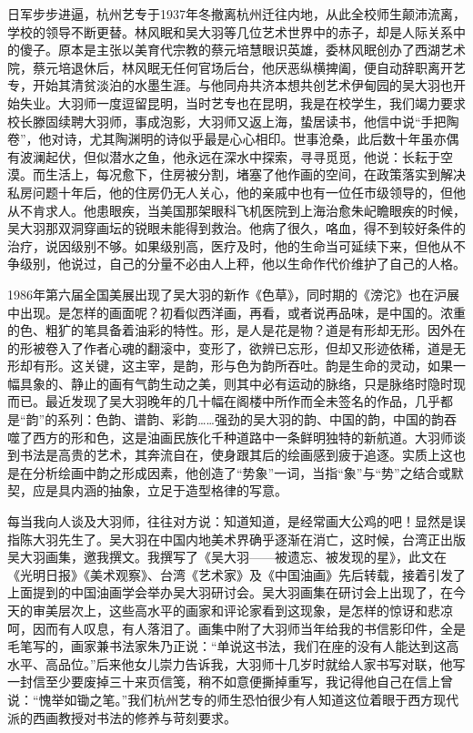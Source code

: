 \documentclass{article}
\begin{document}
日军步步进逼，杭州艺专于1937年冬撤离杭州迁往内地，从此全校师生颠沛流离，学校的领导不断更替。林风眠和吴大羽等几位艺术世界中的赤子，却是人际关系中的傻子。原本是主张以美育代宗教的蔡元培慧眼识英雄，委林风眠创办了西湖艺术院，蔡元培退休后，林风眠无任何官场后台，他厌恶纵横捭阖，便自动辞职离开艺专，开始其清贫淡泊的水墨生涯。与他同舟共济本想共创艺术伊甸园的吴大羽也开始失业。大羽师一度逗留昆明，当时艺专也在昆明，我是在校学生，我们竭力要求校长滕固续聘大羽师，事成泡影，大羽师又返上海，蛰居读书，他信中说“手把陶卷”，他对诗，尤其陶渊明的诗似乎最是心心相印。世事沧桑，此后数十年虽亦偶有波澜起伏，但似潜水之鱼，他永远在深水中探索，寻寻觅觅，他说：长耘于空漠。而生活上，每况愈下，住房被分割，堵塞了他作画的空间，在政策落实到解决私房问题十年后，他的住房仍无人关心，他的亲戚中也有一位任市级领导的，但他从不肯求人。他患眼疾，当美国那架眼科飞机医院到上海治愈朱屺瞻眼疾的时候，吴大羽那双洞穿画坛的锐眼未能得到救治。他病了很久，咯血，得不到较好条件的治疗，说因级别不够。如果级别高，医疗及时，他的生命当可延续下来，但他从不争级别，他说过，自己的分量不必由人上秤，他以生命作代价维护了自己的人格。

1986年第六届全国美展出现了吴大羽的新作《色草》，同时期的《滂沱》也在沪展中出现。是怎样的画面呢？初看似西洋画，再看，或者说再品味，是中国的。浓重的色、粗犷的笔具备着油彩的特性。形，是人是花是物？道是有形却无形。因外在的形被卷入了作者心魂的翻滚中，变形了，欲辨已忘形，但却又形迹依稀，道是无形却有形。这关键，这主宰，是韵，形与色为韵所吞吐。韵是生命的灵动，如果一幅具象的、静止的画有气韵生动之美，则其中必有运动的脉络，只是脉络时隐时现而已。最近发现了吴大羽晚年的几十幅在阁楼中所作而全未签名的作品，几乎都是“韵”的系列：色韵、谱韵、彩韵……强劲的吴大羽的韵、中国的韵，中国的韵吞噬了西方的形和色，这是油画民族化千种道路中一条鲜明独特的新航道。大羽师谈到书法是高贵的艺术，其奔流自在，使身跟其后的绘画感到疲于追逐。实质上这也是在分析绘画中韵之形成因素，他创造了“势象”一词，当指“象”与“势”之结合或默契，应是具内涵的抽象，立足于造型格律的写意。

每当我向人谈及大羽师，往往对方说：知道知道，是经常画大公鸡的吧！显然是误指陈大羽先生了。吴大羽在中国内地美术界确乎逐渐在消亡，这时候，台湾正出版吴大羽画集，邀我撰文。我撰写了《吴大羽——被遗忘、被发现的星》，此文在《光明日报》《美术观察》、台湾《艺术家》及《中国油画》先后转载，接着引发了上面提到的中国油画学会举办吴大羽研讨会。吴大羽画集在研讨会上出现了，在今天的审美层次上，这些高水平的画家和评论家看到这现象，是怎样的惊讶和悲凉呵，因而有人叹息，有人落泪了。画集中附了大羽师当年给我的书信影印件，全是毛笔写的，画家兼书法家朱乃正说：“单说这书法，我们在座的没有人能达到这高水平、高品位。”后来他女儿崇力告诉我，大羽师十几岁时就给人家书写对联，他写一封信至少要废掉三十来页信笺，稍不如意便撕掉重写，我记得他自己在信上曾说：“愧举如锄之笔。”我们杭州艺专的师生恐怕很少有人知道这位着眼于西方现代派的西画教授对书法的修养与苛刻要求。
\end{document}
